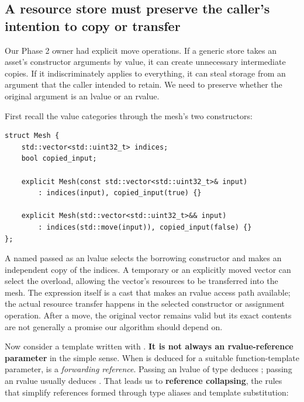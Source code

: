 \subsection{A resource store must preserve the caller's intention to copy or transfer}\label{05-engine-i-ch005-a-resource-store-must-preserve-the-callers-intention-to-copy-or-transfer}

\hypertarget{05-engine-i-ch005-a-resource-store-must-preserve-the-callers-intention-to-copy-or-transfer}{}

Our Phase 2 owner had explicit move operations. If a generic store takes an asset's constructor arguments by value, it can create unnecessary intermediate copies. If it indiscriminately applies  to everything, it can steal storage from an argument that the caller intended to retain. We need to preserve whether the original argument is an lvalue or an rvalue.

First recall the value categories through the mesh's two constructors:

\begin{verbatim}
struct Mesh {
    std::vector<std::uint32_t> indices;
    bool copied_input;

    explicit Mesh(const std::vector<std::uint32_t>& input)
        : indices(input), copied_input(true) {}

    explicit Mesh(std::vector<std::uint32_t>&& input)
        : indices(std::move(input)), copied_input(false) {}
};
\end{verbatim}

A named  passed as an lvalue selects the borrowing  constructor and makes an independent copy of the indices. A temporary or an explicitly moved vector can select the \BookInlineCode{\&\&} overload, allowing the vector's resources to be transferred into the mesh. The  expression itself is a cast that makes an rvalue access path available; the actual resource transfer happens in the selected constructor or assignment operation. After a move, the original vector remains valid but its exact contents are not generally a promise our algorithm should depend on.

Now consider a template written with . \textbf{It is not always an rvalue-reference parameter} in the simple sense. When  is deduced for a suitable function-template parameter,  is a \emph{forwarding reference}. Passing an lvalue of type  deduces ; passing an rvalue usually deduces . That leads us to \textbf{reference collapsing}, the rules that simplify references formed through type aliases and template substitution:

